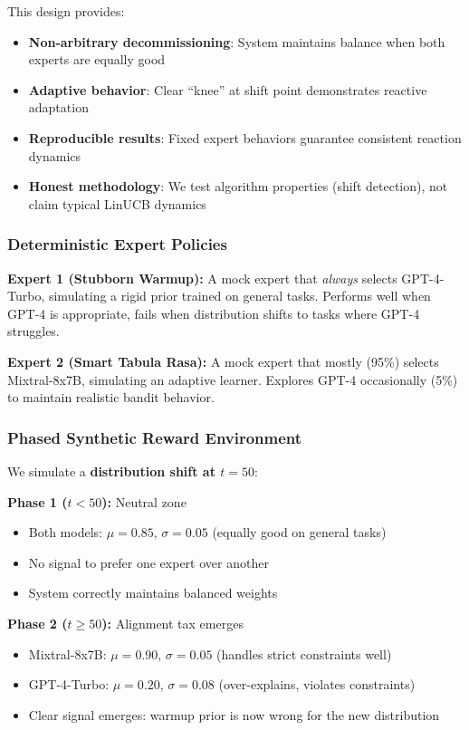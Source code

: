 This design provides:

\begin{itemize}
    \item \textbf{Non-arbitrary decommissioning}: System maintains balance when both experts are equally good
    \item \textbf{Adaptive behavior}: Clear ``knee'' at shift point demonstrates reactive adaptation
    \item \textbf{Reproducible results}: Fixed expert behaviors guarantee consistent reaction dynamics
    \item \textbf{Honest methodology}: We test algorithm properties (shift detection), not claim typical LinUCB dynamics
\end{itemize}

\subsubsection{Deterministic Expert Policies}

\textbf{Expert 1 (Stubborn Warmup):} A mock expert that \emph{always} selects GPT-4-Turbo, simulating a rigid prior trained on general tasks. Performs well when GPT-4 is appropriate, fails when distribution shifts to tasks where GPT-4 struggles.

\textbf{Expert 2 (Smart Tabula Rasa):} A mock expert that mostly (95\%) selects Mixtral-8x7B, simulating an adaptive learner. Explores GPT-4 occasionally (5\%) to maintain realistic bandit behavior.

\subsubsection{Phased Synthetic Reward Environment}

We simulate a \textbf{distribution shift at $t=50$}:

\textbf{Phase 1 ($t < 50$):} Neutral zone
\begin{itemize}
    \item Both models: $\mu = 0.85$, $\sigma = 0.05$ (equally good on general tasks)
    \item No signal to prefer one expert over another
    \item System correctly maintains balanced weights
\end{itemize}

\textbf{Phase 2 ($t \geq 50$):} Alignment tax emerges
\begin{itemize}
    \item Mixtral-8x7B: $\mu = 0.90$, $\sigma = 0.05$ (handles strict constraints well)
    \item GPT-4-Turbo: $\mu = 0.20$, $\sigma = 0.08$ (over-explains, violates constraints)
    \item Clear signal emerges: warmup prior is now wrong for the new distribution
\end{itemize}

